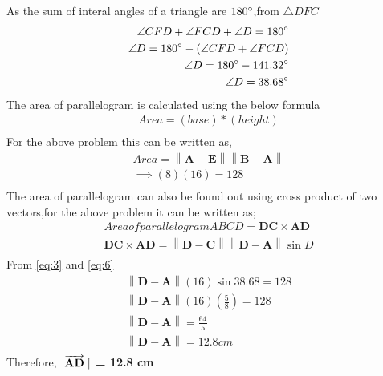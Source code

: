 \documentclass{article}
\providecommand{\norm}[1]{\left\lVert#1\right\rVert}
\let\vec\mathbf
\begin{document}
As the sum of interal angles of a triangle are $180\degree$,from $\triangle{DFC}$\\
\begin{align}
	\angle{CFD} + \angle{FCD} + \angle{D} = 180\degree\\
	\angle{D} = 180\degree - (\angle{CFD} + \angle{FCD})\\
	\angle{D} = 180\degree - 141.32\degree \\
	\angle{D} = 38.68\degree
	\label{eq:4}\\
\end{align}
The area of parallelogram is calculated using the below formula\\
\begin{align}
	Area = (base)*(height)\\
\end{align}
For the above problem this can be written as,
\begin{align}
	Area = \norm{\vec{A} - \vec{E}} \norm{\vec{B} - \vec{A}}\\
	\implies (8) (16) = 128
	\label{eq:5}\\
\end{align}
The area of parallelogram can also be found out using cross product of two vectors,for the above problem it can be written as;
\begin{align}
	Area of parallelogram ABCD = \vec{DC} \times \vec{AD}\\
	\vec{DC} \times \vec{AD} = \norm{\vec{D} - \vec{C}} \norm{\vec{D} - \vec{A}} \sin{D}
	\label{eq:6}\\
\end{align}
From \ref{eq:3} and \ref{eq:6}\\
\begin{align}
	\norm{\vec{D} - \vec{A}} (16) \sin{38.68} = 128\\
	\norm{\vec{D} - \vec{A}} (16) (\frac{5}{8}) = 128\\
	\norm{\vec{D} - \vec{A}} = \frac{64}{5}\\
	\norm{\vec{D} - \vec{A}} = 12.8cm\\
\end{align}
Therefore,$|\hspace{0.1cm}$\textbf{$\overrightarrow{\vec{AD}}\hspace{0.1cm} |$ = 12.8 cm}\\
\end{document}
